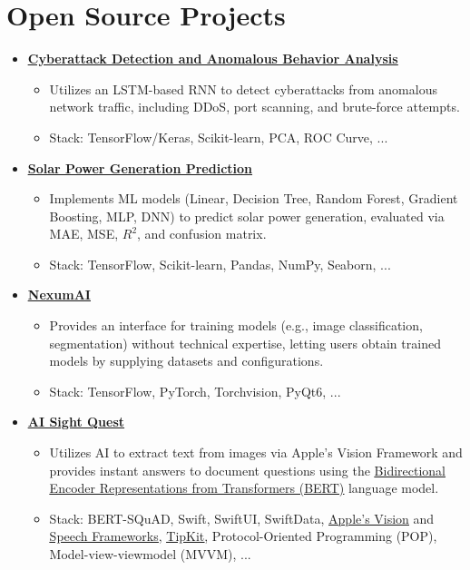 \documentclass[letter,10pt]{article}
\newcommand{\customsquare}{\raisebox{0.25ex}{\scalebox{0.45}{$\blacksquare$}}}
\begin{document}
\section*{Open Source Projects}
\begin{itemize}[label={\customsquare}]
    \item \href{https://github.com/karami-mehdi/CyberattackDetection}{\underline{\textbf{Cyberattack Detection and Anomalous Behavior Analysis}}}
    \begin{itemize}
        \item Utilizes an LSTM-based RNN to detect cyberattacks from anomalous network traffic, including DDoS, port scanning, and brute-force attempts.
        \item Stack: TensorFlow/Keras, Scikit-learn, PCA, ROC Curve, ...
    \end{itemize}

    \item \href{https://github.com/karami-mehdi/SolarPowerGenerationAnalysis}{\underline{\textbf{Solar Power Generation Prediction}}}
    \begin{itemize}
        \item Implements ML models (Linear, Decision Tree, Random Forest, Gradient Boosting, MLP, DNN) to predict solar power generation, evaluated via MAE, MSE, $R^2$, and confusion matrix.
        \item Stack: TensorFlow, Scikit-learn, Pandas, NumPy, Seaborn, ...
    \end{itemize}

    \item \href{https://github.com/AINexumLab/NexumAI}{\underline{\textbf{NexumAI}}}
    \begin{itemize}
        \item Provides an interface for training models (e.g., image classification, segmentation) without technical expertise, letting users obtain trained models by supplying datasets and configurations.
        \item Stack: TensorFlow, PyTorch, Torchvision, PyQt6, ...
    \end{itemize}

    \item \href{https://github.com/karami-mehdi/AISightQuest}{\underline{\textbf{AI Sight Quest}}}
    \begin{itemize}
        \item Utilizes AI to extract text from images via Apple's Vision Framework and provides instant answers to document questions using the \href{https://arxiv.org/abs/1810.04805}{\underline{Bidirectional Encoder Representations from Transformers (BERT)}} language model.
        \item Stack: BERT-SQuAD, Swift, SwiftUI, SwiftData, \href{https://developer.apple.com/documentation/vision}{\underline{Apple's Vision}} and \href{https://developer.apple.com/documentation/speech}{\underline{Speech Frameworks}}, \href{https://developer.apple.com/documentation/tipkit}{\underline{TipKit}}, Protocol-Oriented Programming (POP), Model-view-viewmodel (MVVM), ...
    \end{itemize}


\end{itemize}
\end{document}
